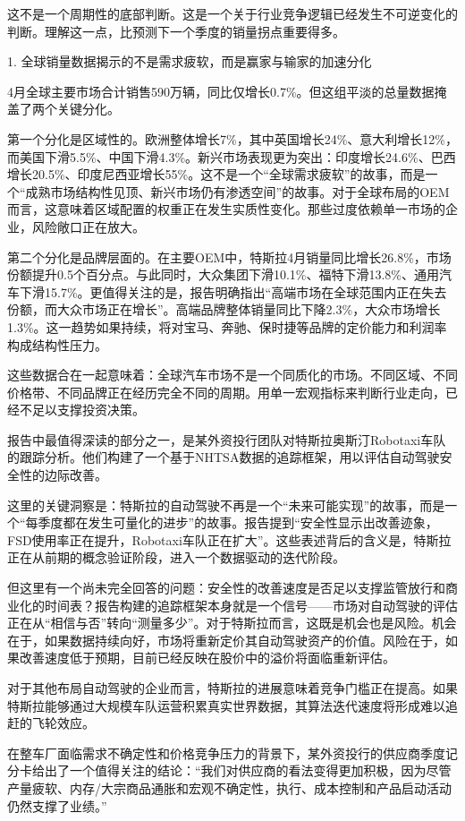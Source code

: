 \documentclass[11pt]{ctexart}
\begin{document}
这不是一个周期性的底部判断。这是一个关于行业竞争逻辑已经发生不可逆变化的判断。理解这一点，比预测下一个季度的销量拐点重要得多。

1. 全球销量数据揭示的不是需求疲软，而是赢家与输家的加速分化

4月全球主要市场合计销售590万辆，同比仅增长0.7\%。但这组平淡的总量数据掩盖了两个关键分化。

第一个分化是区域性的。欧洲整体增长7\%，其中英国增长24\%、意大利增长12\%，而美国下滑5.5\%、中国下滑4.3\%。新兴市场表现更为突出：印度增长24.6\%、巴西增长20.5\%、印度尼西亚增长55\%。这不是一个“全球需求疲软”的故事，而是一个“成熟市场结构性见顶、新兴市场仍有渗透空间”的故事。对于全球布局的OEM而言，这意味着区域配置的权重正在发生实质性变化。那些过度依赖单一市场的企业，风险敞口正在放大。

第二个分化是品牌层面的。在主要OEM中，特斯拉4月销量同比增长26.8\%，市场份额提升0.5个百分点。与此同时，大众集团下滑10.1\%、福特下滑13.8\%、通用汽车下滑15.7\%。更值得关注的是，报告明确指出“高端市场在全球范围内正在失去份额，而大众市场正在增长”。高端品牌整体销量同比下降2.3\%，大众市场增长1.3\%。这一趋势如果持续，将对宝马、奔驰、保时捷等品牌的定价能力和利润率构成结构性压力。

这些数据合在一起意味着：全球汽车市场不是一个同质化的市场。不同区域、不同价格带、不同品牌正在经历完全不同的周期。用单一宏观指标来判断行业走向，已经不足以支撑投资决策。

报告中最值得深读的部分之一，是某外资投行团队对特斯拉奥斯汀Robotaxi车队的跟踪分析。他们构建了一个基于NHTSA数据的追踪框架，用以评估自动驾驶安全性的边际改善。

这里的关键洞察是：特斯拉的自动驾驶不再是一个“未来可能实现”的故事，而是一个“每季度都在发生可量化的进步”的故事。报告提到“安全性显示出改善迹象，FSD使用率正在提升，Robotaxi车队正在扩大”。这些表述背后的含义是，特斯拉正在从前期的概念验证阶段，进入一个数据驱动的迭代阶段。

但这里有一个尚未完全回答的问题：安全性的改善速度是否足以支撑监管放行和商业化的时间表？报告构建的追踪框架本身就是一个信号——市场对自动驾驶的评估正在从“相信与否”转向“测量多少”。对于特斯拉而言，这既是机会也是风险。机会在于，如果数据持续向好，市场将重新定价其自动驾驶资产的价值。风险在于，如果改善速度低于预期，目前已经反映在股价中的溢价将面临重新评估。

对于其他布局自动驾驶的企业而言，特斯拉的进展意味着竞争门槛正在提高。如果特斯拉能够通过大规模车队运营积累真实世界数据，其算法迭代速度将形成难以追赶的飞轮效应。

在整车厂面临需求不确定性和价格竞争压力的背景下，某外资投行的供应商季度记分卡给出了一个值得关注的结论：“我们对供应商的看法变得更加积极，因为尽管产量疲软、内存/大宗商品通胀和宏观不确定性，执行、成本控制和产品启动活动仍然支撑了业绩。”
\end{document}
